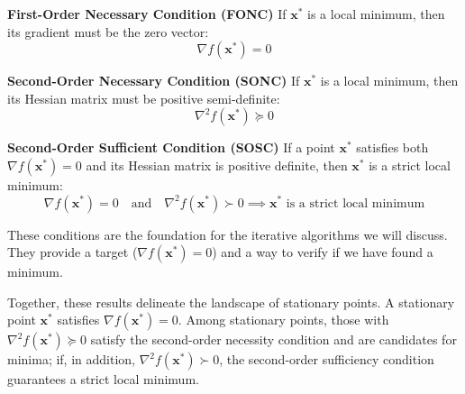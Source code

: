 \begin{definitionBox}
\textbf{First-Order Necessary Condition (FONC)}
If $\mathbf{x}^*$ is a local minimum, then its gradient must be the zero vector:
\begin{equation}
    \nabla f(\mathbf{x}^*) = 0
\end{equation}
\end{definitionBox}

\begin{definitionBox}
\textbf{Second-Order Necessary Condition (SONC)}
If $\mathbf{x}^*$ is a local minimum, then its Hessian matrix must be positive semi-definite:
\begin{equation}
    \nabla^2 f(\mathbf{x}^*) \succeq 0
\end{equation}
\end{definitionBox}

\begin{definitionBox}
\textbf{Second-Order Sufficient Condition (SOSC)}
If a point $\mathbf{x}^*$ satisfies both $\nabla f(\mathbf{x}^*) = 0$ and its Hessian matrix is positive definite, then $\mathbf{x}^*$ is a strict local minimum:
\begin{equation}
    \nabla f(\mathbf{x}^*) = 0 \quad \text{and} \quad \nabla^2 f(\mathbf{x}^*) \succ 0 \implies \mathbf{x}^* \text{ is a strict local minimum}
\end{equation}
\end{definitionBox}
These conditions are the foundation for the iterative algorithms we will discuss. They provide a target ($\nabla f(\mathbf{x}^*) = 0$) and a way to verify if we have found a minimum.

Together, these results delineate the landscape of stationary points. A stationary point $\mathbf{x}^*$ satisfies $\nabla f(\mathbf{x}^*)=0$. Among stationary points, those with $\nabla^2 f(\mathbf{x}^*)\succeq 0$ satisfy the second-order necessity condition and are candidates for minima; if, in addition, $\nabla^2 f(\mathbf{x}^*)\succ 0$, the second-order sufficiency condition guarantees a strict local minimum.


